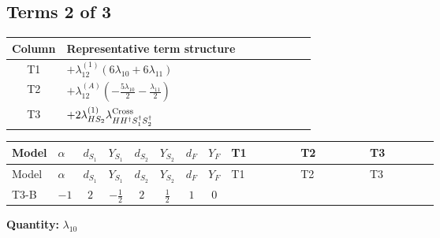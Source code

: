 \documentclass[8pt]{article}
\begin{document}
\begin{landscape}
\subsection*{Terms 2 of 3}
\begin{center}
\begin{tabular}{@{}c >{\raggedright\arraybackslash}p{0.82\linewidth}@{}}
\toprule
Column & Representative term structure \\
\midrule
T1 & \(\displaystyle +{\lambda_{12}^{(1)}} (6 {\lambda_{10}}+6 {\lambda_{11}})\) \\
\midrule
T2 & \(\displaystyle +{\lambda_{12}^{(A)}} \left(-\frac{5 {\lambda_{10}}}{2}-\frac{{\lambda_{11}}}{2}\right)\) \\
\midrule
T3 & \(\displaystyle +2 {\lambda_{HS_2}^{(1)}} {\lambda_{H H^\dagger S_1^\dagger S_2^\dagger}^{\rm Cross}}\) \\
\midrule
\bottomrule
\end{tabular}
\end{center}
\smallskip
\tiny
\begin{longtable}{@{}llcccccc >{\raggedright\arraybackslash}p{0.21\linewidth} >{\raggedright\arraybackslash}p{0.21\linewidth} >{\raggedright\arraybackslash}p{0.21\linewidth}@{}}
\toprule
Model & $\alpha$ & $d_{S_1}$ & $Y_{S_1}$ & $d_{S_2}$ & $Y_{S_2}$ & $d_F$ & $Y_F$ & T1 & T2 & T3 \\
\midrule
\endfirsthead
\toprule
Model & $\alpha$ & $d_{S_1}$ & $Y_{S_1}$ & $d_{S_2}$ & $Y_{S_2}$ & $d_F$ & $Y_F$ & T1 & T2 & T3 \\
\midrule
\endhead
T3-B & $-1$ & $2$ & $-\frac{1}{2}$ & $2$ & $\frac{1}{2}$ & $1$ & $0$ & \scriptsize\adjustbox{max width=\linewidth}{$\begin{gathered} +{\lambda_{12}^{(1)}} (6 {\lambda_{10}}+6 {\lambda_{11}})\end{gathered}$} & \scriptsize\adjustbox{max width=\linewidth}{$\begin{gathered} +{\lambda_{12}^{(A)}} \left(-\frac{5 {\lambda_{10}}}{2}-\frac{{\lambda_{11}}}{2}\right)\end{gathered}$} & \scriptsize\adjustbox{max width=\linewidth}{$\begin{gathered} +2 {\lambda_{HS_2}^{(1)}} {\lambda_{H H^\dagger S_1^\dagger S_2^\dagger}^{\rm Cross}}\end{gathered}$} \\
\midrule
\bottomrule
\end{longtable}
\clearpage
\noindent\textbf{Quantity: }$\lambda_{10}$\par\smallskip

\end{landscape}
\end{document}
